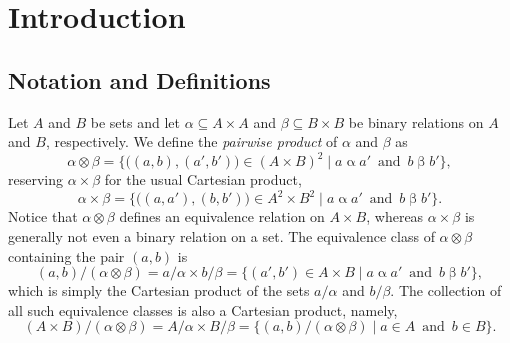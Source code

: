 \section{Introduction}

\subsection{Notation and Definitions}
\label{sec:defs}
Let $A$ and $B$ be sets and let $\alpha \subseteq A\times A$ and $\beta \subseteq B\times B$
be binary relations on $A$ and $B$, respectively.
We define
the \emph{pairwise product} of $\alpha$ and $\beta$ as
\begin{equation}
\label{eq:pair-product}
\alpha \otimes \beta = \{\bigl((a, b), (a', b')\bigr) 
\in (A\times B)^2 \mid a\mathrel{\alpha} a'\, \text{ and } \,  b\mathrel{\beta} b'\},
\end{equation}
reserving $\alpha \times \beta$ for the usual Cartesian product,
\begin{equation}
\label{eq:set-product}
\alpha \times \beta = \{\bigl((a, a'), (b, b')\bigr) 
\in A^2\times B^2 \mid a\mathrel{\alpha} a' \, \text{ and } \, b\mathrel{\beta} b'\}.
\end{equation}
Notice that $\alpha \otimes \beta$ defines an equivalence relation on
$A\times B$, whereas $\alpha\times \beta$ is generally
not even a binary relation on a  set.
The equivalence class of $\alpha \otimes \beta$ containing the pair
$(a, b)$ is %
\[(a,b)/(\alpha \otimes \beta) = a/\alpha \times b/\beta= 
    \{(a', b') \in A\times B \mid a\mathrel{\alpha} a' \, \text{ and } \,  b\mathrel{\beta} b'\},
    \]
which is simply the Cartesian product of the sets $a/\alpha$ and $b/\beta$.
The collection of all such equivalence classes is also a Cartesian product, namely,
\[
(A\times B)/(\alpha \otimes \beta) =
A/\alpha \times B/\beta  = \{(a, b)/(\alpha \otimes \beta) \mid a\in A \, \text{ and } \, b \in B\}.\]
